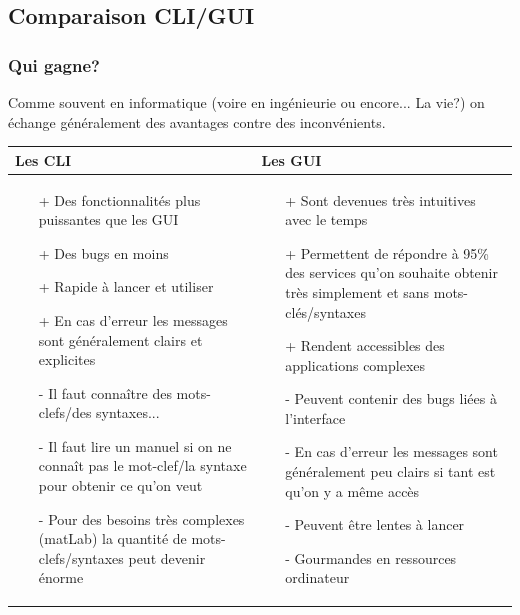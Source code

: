 \documentclass{beamer}
\begin{document}
\subsection{Comparaison CLI/GUI}

\begin{frame}[fragile]
\frametitle{Qui gagne?}

Comme souvent en informatique (voire en ingénieurie ou encore... La vie?) on échange généralement des avantages contre des inconvénients.
\bigskip

\tiny
\begin{tabular}{ | m{20em} | m{20em} | }
    \hline
    \textbf{Les CLI} & \textbf{Les GUI}\\
    \hline
    
    \begin{itemize}
        \item[+] Des fonctionnalités plus puissantes que les GUI
        \item[+] Des bugs en moins
        \item[+] Rapide à lancer et utiliser
        \item[+] En cas d'erreur les messages sont généralement clairs et explicites
        \item[-] Il faut connaître des mots-clefs/des syntaxes...
        \item[-] Il faut lire un manuel si on ne connaît pas le mot-clef/la syntaxe pour obtenir ce qu'on veut
        \item[-] Pour des besoins très complexes (matLab) la quantité de mots-clefs/syntaxes peut devenir énorme
    \end{itemize}
    & 
    \begin{itemize}
        \item[+] Sont devenues très intuitives avec le temps
        \item[+] Permettent de répondre à 95\% des services qu'on souhaite obtenir très simplement et sans mots-clés/syntaxes
        \item[+] Rendent accessibles des applications complexes
        \item[-] Peuvent contenir des bugs liées à l'interface
        \item[-] En cas d'erreur les messages sont généralement peu clairs si tant est qu'on y a même accès
        \item[-] Peuvent être lentes à lancer
        \item[-] Gourmandes en ressources ordinateur
    \end{itemize} \\
    
    \hline
\end{tabular}
\normalsize

\end{frame}
\end{document}
